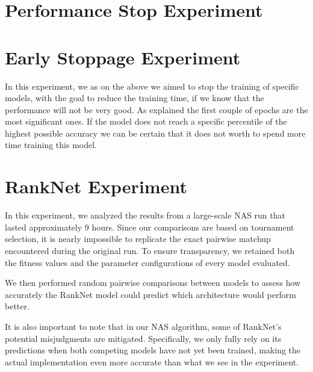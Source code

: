 \section{Performance Stop Experiment}



\section{Early Stoppage Experiment}
In this experiment, we as on the above we aimed to stop the training of specific models, with the goal to reduce the training time, if we know that the performance will not be very good. As explained the first couple of epochs are the most significant ones. If the model does not reach a specific percentile of the highest possible accuracy we can be certain that it does not worth to spend more time training this model.


\section{RankNet Experiment}

In this experiment, we analyzed the results from a large-scale NAS run that lasted approximately 9 hours. Since our comparisons are based on tournament selection, it is nearly impossible to replicate the exact pairwise matchup encountered during the original run. To ensure transparency, we retained both the fitness values and the parameter configurations of every model evaluated.

We then performed random pairwise comparisons between models to assess how accurately the RankNet model could predict which architecture would perform better.

It is also important to note that in our NAS algorithm, some of RankNet's potential misjudgments are mitigated. Specifically, we only fully rely on its predictions when both competing models have not yet been trained, making the actual implementation even more accurate than what we see in the experiment.





